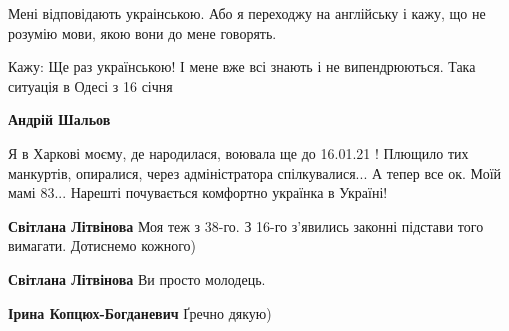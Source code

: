 \begin{itemize}
Мені відповідають украінською. Або я переходжу на англійську і кажу, що не
розумію мови, якою вони до мене говорять.

 
Кажу: Ще раз українською! І мене вже всі знають і не випендрюються. Така ситуація в Одесі з 16 січня

\begin{itemize}
 
\textbf{Андрій Шальов} 

\obeycr
Я в Харкові моєму, де народилася, воювала ще до 16.01.21 !
Плющило тих манкуртів, опиралися, через адміністратора спілкувалися...
А тепер все ок.
Моїй мамі 83...
Нарешті почувається комфортно українка в Україні!
\restorecr

 
\textbf{Світлана Літвінова} Моя теж з 38-го. З 16-го з'явились законні підстави того вимагати. Дотиснемо кожного)

 
\textbf{Світлана Літвінова} Ви просто молодець.

 
\textbf{Ірина Копцюх-Богданевич} Ґречно дякую)
\end{itemize}


\end{itemize}

